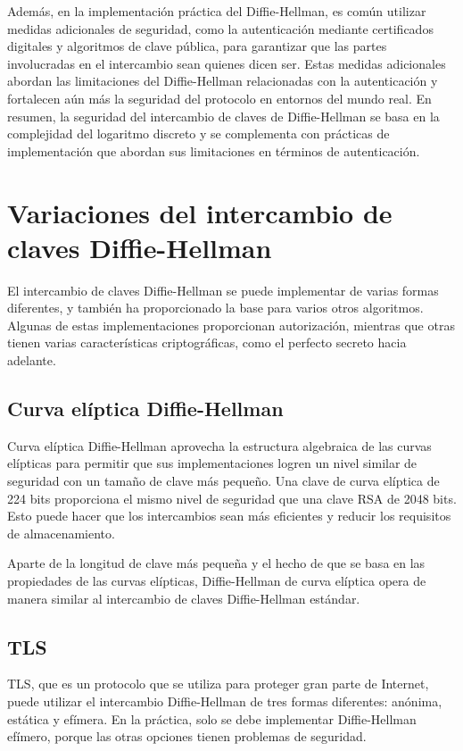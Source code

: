 \documentclass[11pt]{article}
\begin{document}
Además, en la implementación práctica del Diffie-Hellman, es común utilizar medidas adicionales de seguridad, como la autenticación mediante certificados digitales y algoritmos de clave pública, para garantizar que las partes involucradas en el intercambio sean quienes dicen ser. Estas medidas adicionales abordan las limitaciones del Diffie-Hellman relacionadas con la autenticación y fortalecen aún más la seguridad del protocolo en entornos del mundo real. En resumen, la seguridad del intercambio de claves de Diffie-Hellman se basa en la complejidad del logaritmo discreto y se complementa con prácticas de implementación que abordan sus limitaciones en términos de autenticación.

\section{Variaciones del intercambio de claves Diffie-Hellman}

El intercambio de claves Diffie-Hellman se puede implementar de varias formas diferentes, y también ha proporcionado la base para varios otros algoritmos. Algunas de estas implementaciones proporcionan autorización, mientras que otras tienen varias características criptográficas, como el perfecto secreto hacia adelante.

\subsection{Curva elíptica Diffie-Hellman}
Curva elíptica Diffie-Hellman aprovecha la estructura algebraica de las curvas elípticas para permitir que sus implementaciones logren un nivel similar de seguridad con un tamaño de clave más pequeño. Una clave de curva elíptica de 224 bits proporciona el mismo nivel de seguridad que una clave RSA de 2048 bits. Esto puede hacer que los intercambios sean más eficientes y reducir los requisitos de almacenamiento.

Aparte de la longitud de clave más pequeña y el hecho de que se basa en las propiedades de las curvas elípticas, Diffie-Hellman de curva elíptica opera de manera similar al intercambio de claves Diffie-Hellman estándar.

\subsection{TLS}

TLS, que es un protocolo que se utiliza para proteger gran parte de Internet, puede utilizar el intercambio Diffie-Hellman de tres formas diferentes: anónima, estática y efímera. En la práctica, solo se debe implementar Diffie-Hellman efímero, porque las otras opciones tienen problemas de seguridad.
\end{document}
